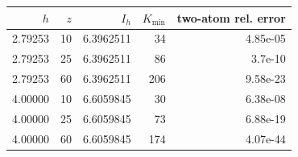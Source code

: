 \begin{tabular}{rrrrr}
\toprule
$h$ & $z$ & $I_h$ & $K_{\min}$ & two-atom rel. error\\
\midrule
2.79253 & 10 & 6.3962511 & 34 & 4.85e-05 \\
2.79253 & 25 & 6.3962511 & 86 & 3.7e-10 \\
2.79253 & 60 & 6.3962511 & 206 & 9.58e-23 \\
4.00000 & 10 & 6.6059845 & 30 & 6.38e-08 \\
4.00000 & 25 & 6.6059845 & 73 & 6.88e-19 \\
4.00000 & 60 & 6.6059845 & 174 & 4.07e-44 \\
\bottomrule
\end{tabular}
